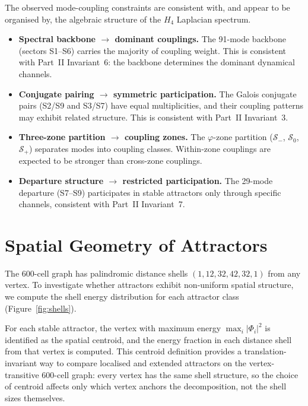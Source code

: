 \documentclass[12pt,a4paper]{article}
\newcommand{\Hfour}{H_4}
\newcommand{\vphi}{\varphi}
\begin{document}
The observed mode-coupling constraints are consistent with, and appear
to be organised by, the algebraic structure of the $\Hfour$ Laplacian
spectrum.

\begin{itemize}[nosep]
\item \textbf{Spectral backbone $\to$ dominant couplings.}
  The 91-mode backbone (sectors S1--S6) carries the majority of
  coupling weight.  This is consistent with Part~II Invariant~6:
  the backbone determines the dominant dynamical channels.

\item \textbf{Conjugate pairing $\to$ symmetric participation.}
  The Galois conjugate pairs (S2/S9 and S3/S7) have equal
  multiplicities, and their coupling patterns may exhibit related
  structure.  This is consistent with Part~II Invariant~3.

\item \textbf{Three-zone partition $\to$ coupling zones.}
  The $\vphi$-zone partition ($\mathcal{S}_-$, $\mathcal{S}_0$,
  $\mathcal{S}_+$) separates modes into coupling classes.
  Within-zone couplings are expected to be stronger than cross-zone
  couplings.

\item \textbf{Departure structure $\to$ restricted participation.}
  The 29-mode departure (S7--S9) participates in stable attractors
  only through specific channels, consistent with Part~II Invariant~7.
\end{itemize}


\section{Spatial Geometry of Attractors}\label{sec:spatial}

The 600-cell graph has palindromic distance shells
$(1, 12, 32, 42, 32, 1)$ from any vertex.  To investigate whether
attractors exhibit non-uniform spatial structure, we compute the
shell energy distribution for each attractor class
(Figure~\ref{fig:shells}).

For each stable attractor, the vertex with maximum energy
$\max_i |\Phi_i|^2$ is identified as the spatial centroid, and the
energy fraction in each distance shell from that vertex is computed.
This centroid definition provides a translation-invariant way to
compare localised and extended attractors on the vertex-transitive
600-cell graph: every vertex has the same shell structure, so the
choice of centroid affects only which vertex anchors the decomposition,
not the shell sizes themselves.
\end{document}

